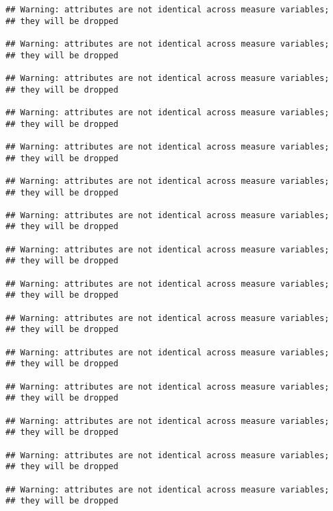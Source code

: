 \documentclass[
]{book}
\begin{document}
\begin{verbatim}
## Warning: attributes are not identical across measure variables;
## they will be dropped

## Warning: attributes are not identical across measure variables;
## they will be dropped

## Warning: attributes are not identical across measure variables;
## they will be dropped

## Warning: attributes are not identical across measure variables;
## they will be dropped

## Warning: attributes are not identical across measure variables;
## they will be dropped

## Warning: attributes are not identical across measure variables;
## they will be dropped

## Warning: attributes are not identical across measure variables;
## they will be dropped

## Warning: attributes are not identical across measure variables;
## they will be dropped

## Warning: attributes are not identical across measure variables;
## they will be dropped

## Warning: attributes are not identical across measure variables;
## they will be dropped

## Warning: attributes are not identical across measure variables;
## they will be dropped

## Warning: attributes are not identical across measure variables;
## they will be dropped

## Warning: attributes are not identical across measure variables;
## they will be dropped

## Warning: attributes are not identical across measure variables;
## they will be dropped

## Warning: attributes are not identical across measure variables;
## they will be dropped
\end{verbatim}
\end{document}
